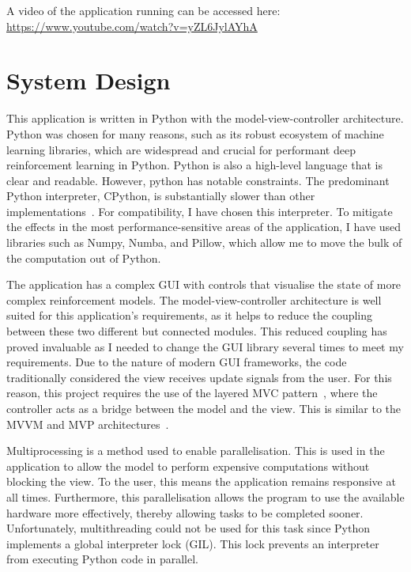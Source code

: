 \documentclass[]{final_report}
\begin{document}
A video of the application running can be accessed here:\\
\url{https://www.youtube.com/watch?v=yZL6JylAYhA}

\section{System Design}\label{section:system-design}

This application is written in Python with the model-view-controller architecture. Python was chosen for many reasons, such as its robust ecosystem of machine learning libraries, which are widespread and crucial for performant deep reinforcement learning in Python. Python is also a high-level language that is clear and readable. However, python has notable constraints. The predominant Python interpreter, CPython, is substantially slower than other implementations~\cite{pythonMachineLearning}. For compatibility, I have chosen this interpreter. To mitigate the effects in the most performance-sensitive areas of the application, I have used libraries such as Numpy, Numba, and Pillow, which allow me to move the bulk of the computation out of Python.  

The application has a complex GUI with controls that visualise the state of more complex reinforcement models. The model-view-controller architecture is well suited for this application's requirements, as it helps to reduce the coupling between these two different but connected modules. This reduced coupling has proved invaluable as I needed to change the GUI library several times to meet my requirements. Due to the nature of modern GUI frameworks, the code traditionally considered the view receives update signals from the user. For this reason, this project requires the use of the layered MVC pattern~\cite{webMVC,gamesMVC}, where the controller acts as a bridge between the model and the view. This is similar to the MVVM and MVP architectures~\cite{mvvm}.

Multiprocessing is a method used to enable parallelisation. This is used in the application to allow the model to perform expensive computations without blocking the view. To the user, this means the application remains responsive at all times. Furthermore, this parallelisation allows the program to use the available hardware more effectively, thereby allowing tasks to be completed sooner. Unfortunately, multithreading could not be used for this task since Python implements a global interpreter lock (GIL). This lock prevents an interpreter from executing Python code in parallel. 
\end{document}
